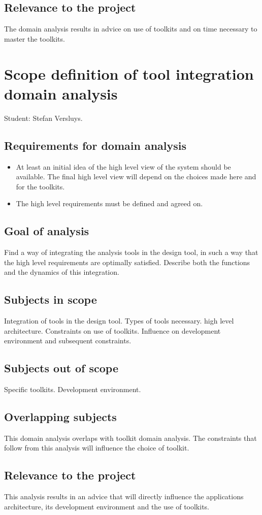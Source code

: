 \documentclass[a4paper,11pt]{article}
\begin{document}
\subsection{Relevance to the project}
The domain analysis results in advice on use of toolkits and on time necessary to master the toolkits.

\section{Scope definition of tool integration domain analysis}
Student: Stefan Versluys.
\subsection{Requirements for domain analysis}
\begin{itemize}
    \item At least an initial idea of the high level view of the system should be available. The final high level
	    view will depend on the choices made here and for the toolkits.
    \item The high level requirements must be defined and agreed on.
\end{itemize}
\subsection{Goal of analysis}
Find a way of integrating the analysis tools in the design tool, in such a way
that the high level requirements are optimally satisfied. Describe both the functions
and the dynamics of this integration.
\subsection{Subjects in scope}
Integration of tools in the design tool. Types of tools necessary.
high level architecture. Constraints on use of toolkits. Influence on development environment and subsequent constraints.
\subsection{Subjects out of scope}
Specific toolkits. Development environment.
\subsection{Overlapping subjects}
This domain analysis overlaps with toolkit domain analysis. The constraints that follow from this analysis
will influence the choice of toolkit.
\subsection{Relevance to the project}
This analysis results in an advice that will directly influence the applications architecture, its development environment
and the use of toolkits.
\end{document}
